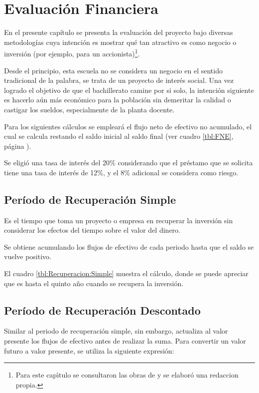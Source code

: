 \chapter{Evaluación Financiera}
\label{cap:Evaluacion:Financiera}

En el presente capítulo se presenta la evaluación del proyecto bajo diversas metodologías cuya intención es mostrar qué tan atractivo es como negocio o inversión (por ejemplo, para un accionista)\footnote{Para este cap\'{\i}tulo se consultaron las obras de \citep{Conant2004, COSS2000, SAPAG2007, Leland2006} y se elabor\'{o} una redaccion propia.}.

Desde el principio, esta escuela no se considera un negocio en el sentido tradicional de la palabra, se trata de un proyecto de interés social. Una vez logrado el objetivo de que el bachillerato camine por si solo, la intención siguiente es hacerlo aún más económico para la población sin demeritar la calidad o castigar los sueldos, especialmente de la planta docente.

Para los siguientes cálculos se empleará el flujo neto de efectivo no acumulado, el cual se calcula restando el saldo inicial al saldo final (ver cuadro \ref{tbl:FNE}, página \pageref{tbl:FNE}).

Se eligió una tasa de interés del 20\% considerando que el préstamo que se solicita tiene una tasa de interés de 12\%, y el 8\% adicional se considera como riesgo.

\section{Período de Recuperación Simple}

Es el tiempo que toma un proyecto o empresa en recuperar la inversión sin considerar los efectos del tiempo sobre el valor del dinero.

Se obtiene acumulando los flujos de efectivo de cada periodo hasta que el saldo se vuelve positivo.

El cuadro \ref{tbl:Recuperacion:Simple} muestra el cálculo, donde se puede apreciar que es hasta el quinto año cuando se recupera la inversión.



\section{Período de Recuperación Descontado}

Similar al periodo de recuperación simple, sin embargo, actualiza al valor presente los flujos de efectivo antes de realizar la suma. Para convertir un valor futuro a valor presente, se utiliza la siguiente expresión:


